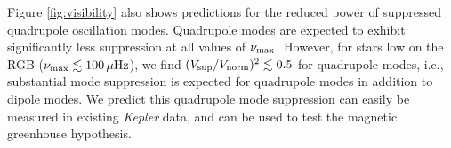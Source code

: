 Figure \ref{fig:visibility} also shows predictions for the reduced power of suppressed quadrupole oscillation modes. Quadrupole modes are expected to exhibit significantly less suppression at all values of $\nu_{\rm max}$. However, for stars low on the RGB ($\nu_{\rm max} \lesssim 100 \, \mu {\rm Hz}$), we find $(V_{\rm sup}/V_{\rm norm})^2 \lesssim 0.5 $ for quadrupole modes, i.e., substantial mode suppression is expected for quadrupole modes in addition to dipole modes. We predict this quadrupole mode suppression can easily be measured in existing {\it Kepler} data, and can be used to test the magnetic greenhouse hypothesis. 
  
  